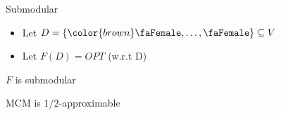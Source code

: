 \begin{frame}{Submodular}
\begin{itemize}[<+->]
  \item Let $D = \{{\color{brown}\text{\faFemale}, \ldots, \text{\faFemale}}\} \subseteq V$
  \item Let $F(D) = OPT$ (w.r.t D)
\end{itemize}

\onslide<+->
\begin{theorem}
$F$ is submodular
\end{theorem}

\onslide<+->
\begin{corollary}
MCM is $1/2$-approximable
\end{corollary}



\end{frame}